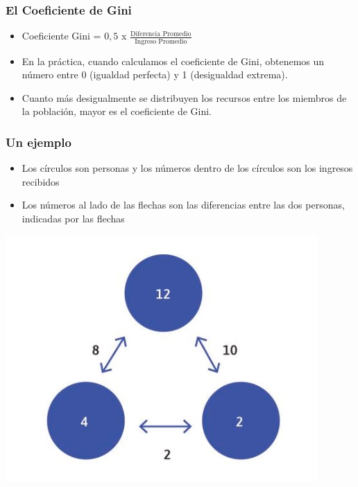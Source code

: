 \documentclass{beamer}
\begin{document}
\begin{frame} 
\frametitle{El Coeficiente de Gini}
\begin{itemize}
\item Coeficiente Gini = $0,5$ x  $\frac{\text{Diferencia Promedio}}{\text{Ingreso Promedio}}$
\item En la práctica, cuando calculamos el coeficiente de Gini, obtenemos un número entre 0 (igualdad perfecta) y 1 (desigualdad extrema). 
\item Cuanto más desigualmente se distribuyen los recursos entre los miembros de la población, mayor es el coeficiente de Gini.
\end{itemize}
\end{frame}


\begin{frame} 
\frametitle{Un ejemplo}
\begin{itemize}
    \item Los círculos son personas y los números dentro de los círculos son los ingresos recibidos
    \item Los números al lado de las flechas son las diferencias entre las dos personas, indicadas por las flechas
\end{itemize} 
    \begin{center}    
    \includegraphics[scale=0.5]{Slides Principios de Economia/Tema_04.15_gini.jpg}
    \end{center}
\end{frame}
\end{document}
